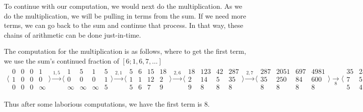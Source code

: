 \documentclass[12pt]{article}
\theoremstyle{remark}
\begin{document}
To continue with our computation, we would next do the multiplication. As we do the multiplication, we will be pulling in terms from the sum. If we need more terms, we can go back to the sum and continue that process. In that way, these chains of arithmetic can be done just-in-time. 

The computation for the multiplication is as follows, where to get the first term, we use the sum's continued fraction of $[6; 1, 6, 7, \ldots]$
\begin{multline*}
 \big\langle\begin{smallmatrix}
  0 & 0 & 0 & 1\\
  1 & 0 & 0 & 0\\
  0 & 0 & 0 & \infty
\end{smallmatrix}\big\rangle
\xrightarrow{1, 5}
\big\langle\begin{smallmatrix}
  1 & 5 & 1 & 5\\
  0 & 0 & 0 & 1\\
  \infty & \infty & \infty & 5 
\end{smallmatrix}\big\rangle   
\xrightarrow{2, 1}
\big\langle\begin{smallmatrix}
  5 & 6 & 15 & 18\\
  1 & 1 & 12 & 2\\
  5 & 6 & 7 & 9 
\end{smallmatrix}\big\rangle  \xrightarrow{2, 6}
\big\langle\begin{smallmatrix}
  18 & 123 & 42 & 287\\
  2 & 14 & 5 & 35  \\
  9 & 8 & 8 & 8 
\end{smallmatrix}\big\rangle  
\xrightarrow{2, 7}
\big\langle\begin{smallmatrix}
  287 & 2051 & 697 & 4981\\
  35 & 250 & 84 & 600  \\
  8 & 8 & 8 & 8 
\end{smallmatrix}\big\rangle 
\xrightarrow[8]{}
\big\langle\begin{smallmatrix}
  35 & 250 & 84 & 600  \\
  7  & 51 & 25 & 181  \\
  5 & 4 & 3 & 3 
\end{smallmatrix}\big\rangle 
\end{multline*}

Thus after some laborious computations, we have the first term is 8. 
\end{document}
